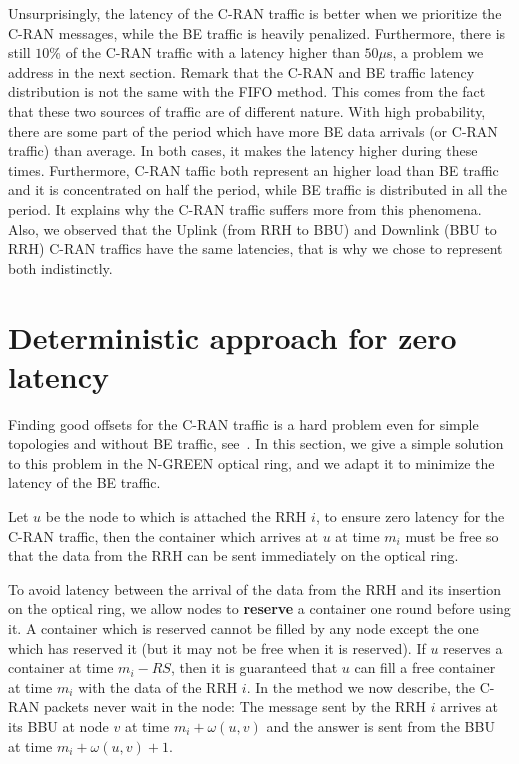 \documentclass[10pt, conference, letterpaper]{IEEEtran}
\begin{document}
Unsurprisingly, the latency of the C-RAN traffic is better when we prioritize the C-RAN messages, while the BE traffic is heavily penalized. Furthermore, there is still $10\%$ of the C-RAN traffic with a latency higher than $50 \mu$s, a problem we address in the next section. Remark that the C-RAN and BE traffic latency distribution is not the same with the FIFO method. This comes from the fact that these two sources of traffic are of different nature. With high probability, there are some part of the period which have more 
BE data arrivals (or C-RAN traffic) than average. In both cases, it makes the latency higher during these times. Furthermore, C-RAN taffic both represent an higher load than BE traffic and it is concentrated on half the period, while BE traffic is distributed in all the period.
It explains why the C-RAN traffic suffers more from this phenomena.
Also, we observed that the Uplink (from RRH to BBU) and Downlink (BBU to RRH) C-RAN traffics have the same latencies, that is why we chose to represent both indistinctly.



\section{Deterministic approach for zero latency} \label{sec:deterministicalgorithms}

Finding good offsets for the C-RAN traffic is a hard problem even for simple topologies and without BE traffic, see~\cite{dominique2018deterministic}. In this section, we give a simple solution to this problem in the N-GREEN optical ring, and we adapt it to minimize the latency of the BE traffic.

Let $u$ be the node to which is attached the RRH $i$, to ensure zero latency for the C-RAN traffic, then the container which arrives at $u$ at time $m_i$ must be free so that the data from the RRH can be sent immediately on the optical ring. 

To avoid latency between the arrival of the data from the RRH and its insertion on the optical ring, 
we allow nodes to \textbf{reserve} a container one round before using it. A container which is reserved cannot be filled by any node except the one which has reserved it (but it may not be free when it is reserved). 
If $u$ reserves a container at time $m_i - RS$, then it is guaranteed that $u$ can fill a free container at time $m_i$ with the data of the RRH $i$.
In the method we now describe, the C-RAN packets never wait in the node: The message sent by the RRH $i$ arrives at its BBU at node $v$ at time $m_i + \omega(u,v)$ and the answer is sent from the BBU at time $m_i + \omega(u,v) +1$.
\end{document}
